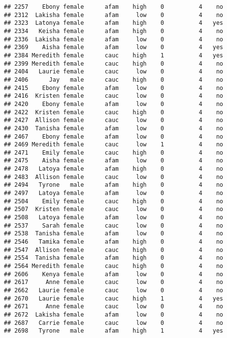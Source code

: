 \documentclass[
]{article}
\begin{document}
\begin{verbatim}
## 2257    Ebony female      afam    high    0          4    no
## 2312  Lakisha female      afam     low    0          4    no
## 2323  Latonya female      afam    high    0          4   yes
## 2334   Keisha female      afam    high    0          4    no
## 2336  Lakisha female      afam     low    0          4    no
## 2369    Aisha female      afam     low    0          4   yes
## 2384 Meredith female      cauc    high    1          4   yes
## 2399 Meredith female      cauc    high    0          4    no
## 2404   Laurie female      cauc     low    0          4    no
## 2406      Jay   male      cauc    high    0          4    no
## 2415    Ebony female      afam     low    0          4    no
## 2416  Kristen female      cauc     low    0          4    no
## 2420    Ebony female      afam     low    0          4    no
## 2422  Kristen female      cauc    high    0          4    no
## 2427  Allison female      cauc     low    0          4    no
## 2430  Tanisha female      afam     low    0          4    no
## 2467    Ebony female      afam     low    0          4    no
## 2469 Meredith female      cauc     low    1          4    no
## 2471    Emily female      cauc    high    0          4    no
## 2475    Aisha female      afam     low    0          4    no
## 2478   Latoya female      afam    high    0          4    no
## 2483  Allison female      cauc     low    0          4    no
## 2494   Tyrone   male      afam    high    0          4    no
## 2497   Latoya female      afam     low    0          4    no
## 2504    Emily female      cauc    high    0          4    no
## 2507  Kristen female      cauc     low    0          4    no
## 2508   Latoya female      afam     low    0          4    no
## 2537    Sarah female      cauc     low    0          4    no
## 2538  Tanisha female      afam     low    0          4    no
## 2546   Tamika female      afam    high    0          4    no
## 2547  Allison female      cauc    high    0          4    no
## 2554  Tanisha female      afam    high    0          4    no
## 2564 Meredith female      cauc    high    0          4    no
## 2606    Kenya female      afam     low    0          4    no
## 2617     Anne female      cauc     low    0          4    no
## 2662   Laurie female      cauc     low    0          4    no
## 2670   Laurie female      cauc    high    1          4   yes
## 2671     Anne female      cauc     low    0          4    no
## 2672  Lakisha female      afam     low    0          4    no
## 2687   Carrie female      cauc     low    0          4    no
## 2698   Tyrone   male      afam    high    1          4   yes

\end{verbatim}
\end{document}
